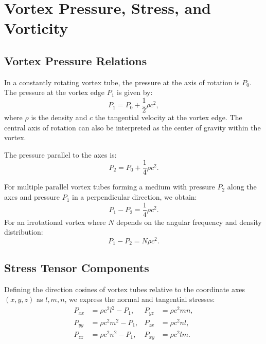 

    \section{Vortex Pressure, Stress, and Vorticity}

    \subsection*{Vortex Pressure Relations}
    In a constantly rotating vortex tube, the pressure at the axis of rotation is $P_0$. The pressure at the vortex edge $P_1$ is given by:
    \begin{equation*}
        P_1 = P_0 + \frac{1}{2} \rho c^2,
    \end{equation*}
    where $\rho$ is the density and $c$ the tangential velocity at the vortex edge. The central axis of rotation can also be interpreted as the center of gravity within the vortex.

    The pressure parallel to the axes is:
    \begin{equation*}
        P_2 = P_0 + \frac{1}{4} \rho c^2.
    \end{equation*}

    For multiple parallel vortex tubes forming a medium with pressure $P_2$ along the axes and pressure $P_1$ in a perpendicular direction, we obtain:
    \begin{equation*}
        P_1 - P_2 = \frac{1}{4} \rho c^2.
    \end{equation*}
    For an irrotational vortex where $N$ depends on the angular frequency and density distribution:
    \begin{equation*}
        P_1 - P_2 = N \rho c^2.
    \end{equation*}

    \subsection*{Stress Tensor Components}
    Defining the direction cosines of vortex tubes relative to the coordinate axes $(x, y, z)$ as $l, m, n$, we express the normal and tangential stresses:
    \begin{align}
        P_{xx} &= \rho c^2 l^2 - P_1, & P_{yz} &= \rho c^2 m n, \\
        P_{yy} &= \rho c^2 m^2 - P_1, & P_{zx} &= \rho c^2 n l, \\
        P_{zz} &= \rho c^2 n^2 - P_1, & P_{xy} &= \rho c^2 l m.
    \end{align}

